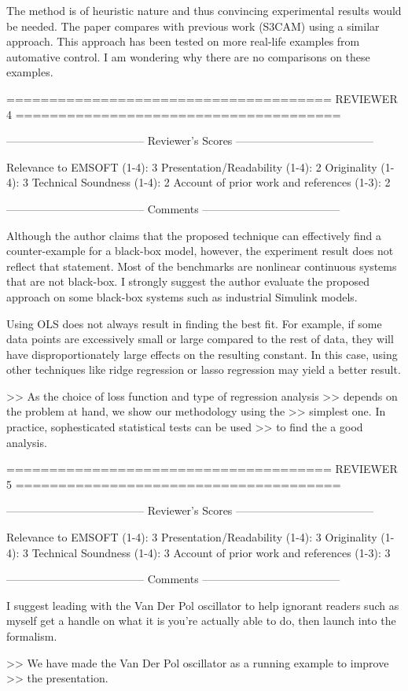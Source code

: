 The method is of heuristic nature and thus convincing experimental results
would be needed. The paper compares with previous work (S3CAM) using a similar
approach. This approach has been tested on more real-life examples from
automative control. I am wondering why there are no comparisons on these
examples.

======================================
                            REVIEWER 4
======================================


--------------------------------------
Reviewer's Scores
--------------------------------------

               Relevance to EMSOFT (1-4): 3
          Presentation/Readability (1-4): 2
                       Originality (1-4): 3
               Technical Soundness (1-4): 2
Account of prior work and references (1-3): 2


--------------------------------------
Comments
--------------------------------------

Although the author claims that the proposed technique can effectively find a
counter-example for a black-box model, however, the experiment result does not
reflect that statement. Most of the benchmarks are nonlinear continuous systems
that are not black-box. I strongly suggest the author evaluate the proposed
approach on some black-box systems such as industrial Simulink models.

Using OLS does not always result in finding the best fit. For example, if some
data points are excessively small or large compared to the rest of data, they
will have disproportionately large effects on the resulting constant. In this
case, using other techniques like ridge regression or lasso regression may
yield a better result.

>> As the choice of loss function and type of regression analysis
>> depends on the problem at hand, we show our methodology using the
>> simplest one. In practice, sophesticated statistical tests can be used
>> to find the a good analysis.


======================================
                            REVIEWER 5
======================================


--------------------------------------
Reviewer's Scores
--------------------------------------

               Relevance to EMSOFT (1-4): 3
          Presentation/Readability (1-4): 3
                       Originality (1-4): 3
               Technical Soundness (1-4): 3
Account of prior work and references (1-3): 3


--------------------------------------
Comments
--------------------------------------

I suggest leading with the Van Der Pol oscillator to help ignorant
readers such as myself get a handle on what it is you're actually able
to do, then launch into the formalism.

>> We have made the Van Der Pol oscillator as a running example to improve
>> the presentation.
